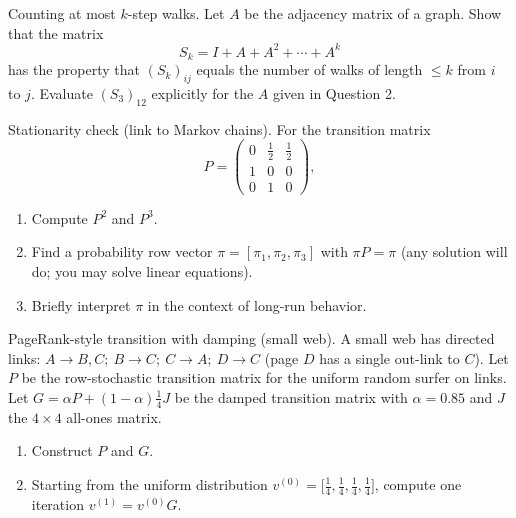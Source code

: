 \documentclass[11pt]{article}
\def\textbf#1{#1}%
\newcounter{question}
\begin{document}
\begin{question}
\textbf{Counting at most \(k\)-step walks.}
Let \(A\) be the adjacency matrix of a graph. Show that the matrix
\[
S_k=I+A+A^2+\cdots+A^k
\]
has the property that \((S_k)_{ij}\) equals the number of walks of length \(\le k\) from \(i\) to \(j\).  
Evaluate \((S_3)_{12}\) explicitly for the \(A\) given in Question 2.
\end{question}

\begin{question}
\textbf{Stationarity check (link to Markov chains).}
For the transition matrix
\[
P=\begin{pmatrix}
0&\tfrac12&\tfrac12\\
1&0&0\\
0&1&0
\end{pmatrix},
\]
\begin{enumerate}
  \item Compute \(P^2\) and \(P^3\).  
  \item Find a probability row vector \(\pi=[\pi_1,\pi_2,\pi_3]\) with \(\pi P=\pi\) (any solution will do; you may solve linear equations).  
  \item Briefly interpret \(\pi\) in the context of long-run behavior.
\end{enumerate}
\end{question}

\begin{question}
\textbf{PageRank-style transition with damping (small web).}
A small web has directed links:
\(A\to B,C;\ B\to C;\ C\to A;\ D\to C\) (page \(D\) has a single out-link to \(C\)).  
Let \(P\) be the row-stochastic transition matrix for the uniform random surfer on links.  
Let \(G=\alpha P+(1-\alpha)\frac{1}{4}J\) be the damped transition matrix with \(\alpha=0.85\) and \(J\) the \(4\times4\) all-ones matrix.
\begin{enumerate}
  \item Construct \(P\) and \(G\).
  \item Starting from the uniform distribution \(v^{(0)}=\big[\tfrac14,\tfrac14,\tfrac14,\tfrac14\big]\), compute one iteration \(v^{(1)}=v^{(0)}G\).
\end{enumerate}
\end{question}
\end{document}
